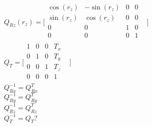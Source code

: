 $Q_{Rz}(r_{z})=\lbrack \begin{matrix}
\cos (r_{z}) & -\sin (r_{z}) & 0 & 0 & \\
\sin (r_{z}) & \cos (r_{z}) & 0 & 0 & \\
0 & 0 & 1 & 0 & \\
0 & 0 & 0 & 1 & \\
\end{matrix}
\rbrack $\\


$Q_{T}=\lbrack \begin{matrix}
1 & 0 & 0 & T_{x} & \\
0 & 1 & 0 & T_{y} & \\
0 & 0 & 1 & T_{z} & \\
0 & 0 & 0 & 1 & \\
\end{matrix}
\rbrack $\\


$Q_{Rx}^{-1}=Q_{Rx}^{T}$\\


$Q_{Ry}^{-1}=Q_{Ry}^{T}$\\


$Q_{Rz}^{-1}=Q_{Rz}^{T}$\\


$Q_{T}^{-1}=Q_{T}$?

